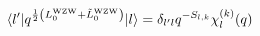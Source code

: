 \begin{equation}
 \langle l' |
  q^{{1 \over 2}
  \left( L_0^{\rm WZW} + {\tilde L}_0^{\rm WZW} \right)}
 | l \rangle
 = \delta_{l'l} q^{-S_{l,k}} \chi^{(k)}_l(q)
\end{equation}

